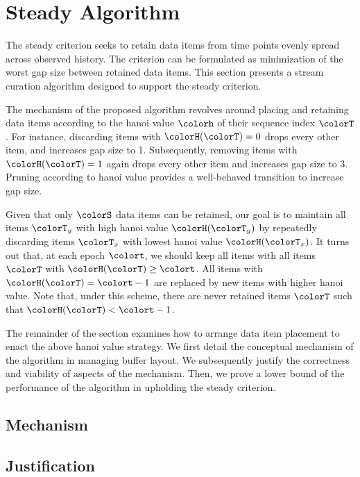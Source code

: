 \section{Steady Algorithm} \label{sec:steady}

The steady criterion seeks to retain data items from time points evenly spread across observed history.
The criterion can be formulated as minimization of the worst gap size between retained data items.
This section presents a stream curation algorithm designed to support the steady criterion.

The mechanism of the proposed algorithm revolves around placing and retaining data items according to the hanoi value $\colorh$ of their sequence index $\colorT$.
For instance, discarding items with $\colorH(\colorT) = 0$ drops every other item, and increases gap size to 1.
Subsequently, removing items with $\colorH(\colorT) = 1$ again drops every other item and increases gap size to 3.
Pruning according to hanoi value provides a well-behaved transition to increase gap size.

Given that only $\colorS$ data items can be retained, our goal is to maintain all items $\colorT_y$ with high hanoi value $\colorH(\colorT_y)$ by repeatedly discarding items $\colorT_x$ with lowest hanoi value $\colorH(\colorT_x)$.
It turns out that, at each epoch $\colort$, we should keep all items with all items $\colorT$ with $\colorH(\colorT) \geq \colort$.
All items with $\colorH(\colorT) = \colort - 1$ are replaced by new items with higher hanoi value.
Note that, under this scheme, there are never retained items $\colorT$ such that $\colorH(\colorT) < \colort - 1$.

The remainder of the section examines how to arrange data item placement to enact the above hanoi value strategy.
We first detail the conceptual mechanism of the algorithm in managing buffer layout.
We subsequently justify the correctness and viability of aspects of the mechanism.
Then, we prove a lower bound of the performance of the algorithm in upholding the steady criterion.

\subsection{Mechanism}



\subsection{Justification}

